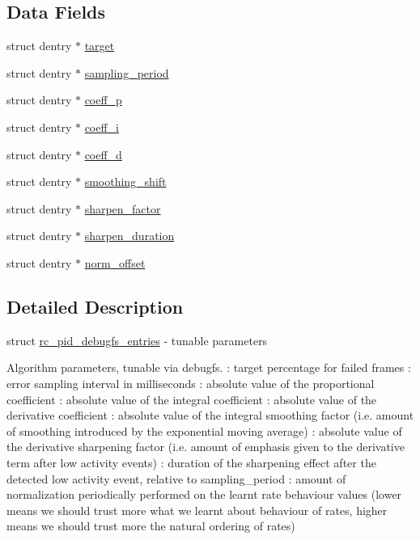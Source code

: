 \subsection*{Data Fields}
\begin{DoxyCompactItemize}
\item 
struct dentry $\ast$ \hyperlink{structrc__pid__debugfs__entries_a6dabe07e2b398ac0f58ac8f38a4b56b6}{target}
\item 
struct dentry $\ast$ \hyperlink{structrc__pid__debugfs__entries_a76915207e9f4be745cf591cabb1ba17c}{sampling\-\_\-period}
\item 
struct dentry $\ast$ \hyperlink{structrc__pid__debugfs__entries_a1a4e446a756b61017c2b85a6d8fa70c5}{coeff\-\_\-p}
\item 
struct dentry $\ast$ \hyperlink{structrc__pid__debugfs__entries_ad6b82f12eff1d91fb126c328e1e9a160}{coeff\-\_\-i}
\item 
struct dentry $\ast$ \hyperlink{structrc__pid__debugfs__entries_a8e02c39865c25ddbe3542a9f0ee711a1}{coeff\-\_\-d}
\item 
struct dentry $\ast$ \hyperlink{structrc__pid__debugfs__entries_aaca47ee03a834e073bbf46987f4a531b}{smoothing\-\_\-shift}
\item 
struct dentry $\ast$ \hyperlink{structrc__pid__debugfs__entries_a97f17182415214fc8cccde6894e0c815}{sharpen\-\_\-factor}
\item 
struct dentry $\ast$ \hyperlink{structrc__pid__debugfs__entries_aa529c80eecd02e36617d50510a0258a9}{sharpen\-\_\-duration}
\item 
struct dentry $\ast$ \hyperlink{structrc__pid__debugfs__entries_a08c42d2f89165fa314dbc2d527fad94d}{norm\-\_\-offset}
\end{DoxyCompactItemize}


\subsection{Detailed Description}
struct \hyperlink{structrc__pid__debugfs__entries}{rc\-\_\-pid\-\_\-debugfs\-\_\-entries} -\/ tunable parameters

Algorithm parameters, tunable via debugfs. \-: target percentage for failed frames \-: error sampling interval in milliseconds \-: absolute value of the proportional coefficient \-: absolute value of the integral coefficient \-: absolute value of the derivative coefficient \-: absolute value of the integral smoothing factor (i.\-e. amount of smoothing introduced by the exponential moving average) \-: absolute value of the derivative sharpening factor (i.\-e. amount of emphasis given to the derivative term after low activity events) \-: duration of the sharpening effect after the detected low activity event, relative to sampling\-\_\-period \-: amount of normalization periodically performed on the learnt rate behaviour values (lower means we should trust more what we learnt about behaviour of rates, higher means we should trust more the natural ordering of rates) 

